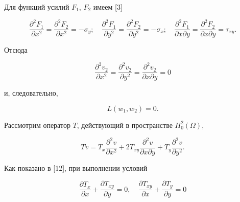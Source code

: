  


Для функций усилий $F_1$, $F_2$ имеем [3] 


\begin{equation} 


\frac{\partial^2 F_1}{\partial x^2}= 


\frac{\partial^2 F_2}{\partial x^2}=-\sigma_y;\quad 


\frac{\partial^2 F_1}{\partial y^2}= 


\frac{\partial^2 F_2}{\partial y^2}=-\sigma_x;\quad 


\frac{\partial^2 F_1}{\partial x\partial y}= 


\frac{\partial^2 F_2}{\partial x\partial y}=\tau_{xy}. 


\end{equation} 


Отсюда 


\begin{equation} 


\frac{\partial^2 v_2}{\partial x^2}= 


\frac{\partial^2 v_2}{\partial y^2}= 


\frac{\partial^2 v_2}{\partial x\partial y}=0 


\end{equation} 


и, следовательно, 


\begin{equation} 


L(w_1,w_2)=0. 


\end{equation} 


Рассмотрим оператор $T$, действующий в пространстве $H^2_0(\Omega)$, 


\begin{equation} 


Tv=T_x\frac{\partial^2 v}{\partial x^2}+2T_{xy} 


\frac{\partial^2 v}{\partial x\partial y}+T_y 


\frac{\partial^2 v}{\partial y^2}. 


\end{equation} 


Как показано в [12], при выполнении условий 


\begin{equation} 


\frac{\partial T_x}{\partial x}+ 


\frac{\partial T_{xy}}{\partial y}=0,\quad 


\frac{\partial T_{xy}}{\partial x}+ 


\frac{\partial T_y}{\partial y}=0 


\end{equation} 


